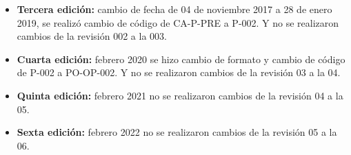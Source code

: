 \begin{itemize}
	\item \textbf{Tercera edición:} cambio de fecha de 04 de noviembre 2017 a 28 de enero 2019, se realizó cambio de código de CA-P-PRE a P-002. Y no se realizaron cambios de la revisión 002 a la 003.
	\item \textbf{Cuarta edición:} febrero 2020 se hizo cambio de formato y cambio de código de P-002 a PO-OP-002. Y no se realizaron cambios de la revisión 03 a la 04.
	\item \textbf{Quinta edición:} febrero 2021 no se realizaron cambios de la revisión 04 a la 05.
	\item \textbf{Sexta edición:} febrero 2022 no se realizaron cambios de la revisión 05 a la 06.
\end{itemize}
